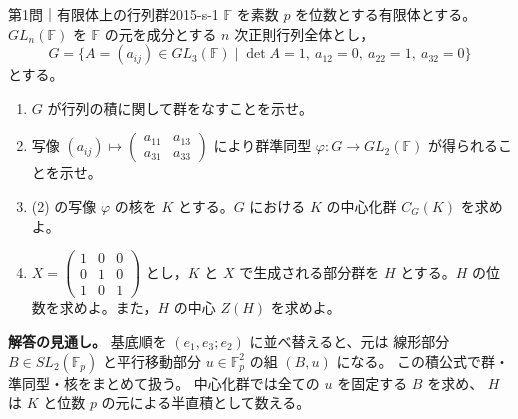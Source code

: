 \begin{problem}{第1問｜有限体上の行列群}{2015-s-1}
$\mathbb F$ を素数 $p$ を位数とする有限体とする。$GL_n(\mathbb F)$ を $\mathbb F$ の元を成分とする
$n$ 次正則行列全体とし，
\[
G=\{A=(a_{ij})\in GL_3(\mathbb F)\mid\det A=1,\ a_{12}=0,\ a_{22}=1,\ a_{32}=0\}
\]
とする。
\begin{enumerate}
  \item[(1)] $G$ が行列の積に関して群をなすことを示せ。
  \item[(2)] 写像 $(a_{ij})\mapsto\begin{pmatrix}a_{11}&a_{13}\\a_{31}&a_{33}\end{pmatrix}$ により群準同型 $\varphi:G\to GL_2(\mathbb F)$ が得られることを示せ。
  \item[(3)] (2) の写像 $\varphi$ の核を $K$ とする。$G$ における $K$ の中心化群 $C_G(K)$ を求めよ。
  \item[(4)] $X=\begin{pmatrix}1&0&0\\0&1&0\\1&0&1\end{pmatrix}$ とし，$K$ と $X$ で生成される部分群を $H$ とする。$H$ の位数を求めよ。また，$H$ の中心 $Z(H)$ を求めよ。
\end{enumerate}
\end{problem}
\begin{memo*}
\textbf{解答の見通し。}
基底順を $(e_1,e_3;e_2)$ に並べ替えると、元は
線形部分 $B\in SL_2(\mathbb F_p)$ と平行移動部分 $u\in\mathbb F_p^2$ の組 $(B,u)$ になる。
この積公式で群・準同型・核をまとめて扱う。
中心化群では全ての $u$ を固定する $B$ を求め、
$H$ は $K$ と位数 $p$ の元による半直積として数える。
\end{memo*}
